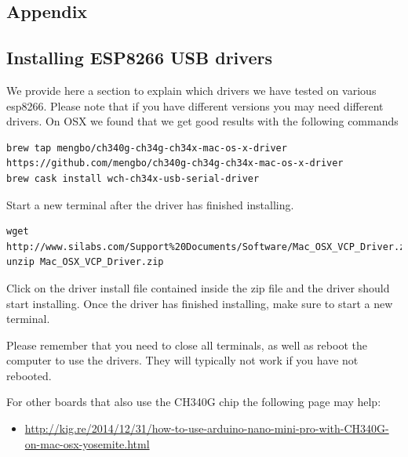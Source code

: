 \subsection{Appendix}\label{appendix}

\subsection{Installing ESP8266 USB
drivers}\label{installing-esp8266-usb-drivers}

We provide here a section to explain which drivers we have tested on
various esp8266. Please note that if you have different versions you may
need different drivers. On OSX we found that we get good results with
the following commands

\begin{verbatim}
brew tap mengbo/ch340g-ch34g-ch34x-mac-os-x-driver https://github.com/mengbo/ch340g-ch34g-ch34x-mac-os-x-driver
brew cask install wch-ch34x-usb-serial-driver
\end{verbatim}

Start a new terminal after the driver has finished installing.

\begin{verbatim}
wget http://www.silabs.com/Support%20Documents/Software/Mac_OSX_VCP_Driver.zip
unzip Mac_OSX_VCP_Driver.zip
\end{verbatim}

Click on the driver install file contained inside the zip file and the
driver should start installing. Once the driver has finished installing,
make sure to start a new terminal.

Please remember that you need to close all terminals, as well as reboot
the computer to use the drivers. They will typically not work if you
have not rebooted.

For other boards that also use the CH340G chip the following page may
help:

\begin{itemize}
\tightlist
\item
  \url{http://kig.re/2014/12/31/how-to-use-arduino-nano-mini-pro-with-CH340G-on-mac-osx-yosemite.html}
\end{itemize}
